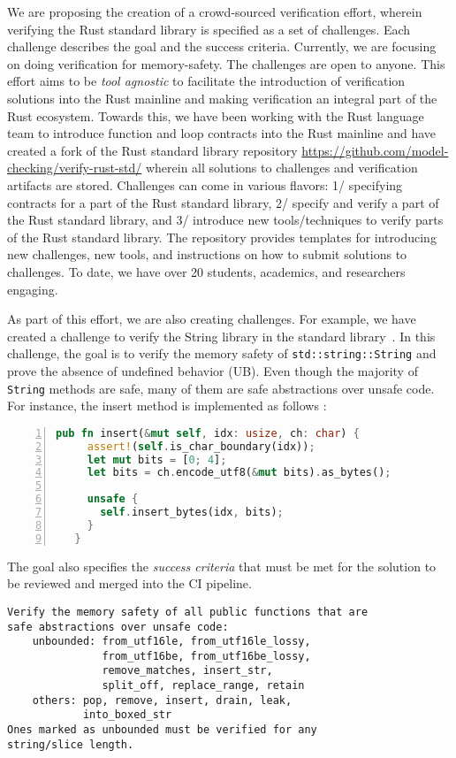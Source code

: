 \documentclass[runningheads]{llncs}
\begin{document}
We are proposing the creation of a crowd-sourced verification effort, wherein verifying the Rust standard library is specified as a set of challenges. Each challenge describes the goal and the success criteria. Currently, we are focusing on doing verification for memory-safety. The challenges are open to anyone. This effort aims to be \textit{tool agnostic} to facilitate the introduction of verification solutions into the Rust mainline and making verification an integral part of the Rust ecosystem. Towards this, we have been working with the Rust language team to introduce function and loop contracts into the Rust mainline and have created a fork of the Rust standard library repository \url{https://github.com/model-checking/verify-rust-std/} wherein all solutions to challenges and verification artifacts are stored. Challenges can come in various flavors: 1/ specifying contracts for a part of the Rust standard library, 2/ specify and verify a part of the Rust standard library, and 3/ introduce new tools/techniques to verify parts of the Rust standard library. The repository provides templates for introducing new challenges, new tools, and instructions on how to submit solutions to challenges. To date, we have over 20 students, academics, and researchers engaging.

As part of this effort, we are also creating challenges. For example, we have created a challenge to verify the String library in the standard library~\cite{stringChallenge}. In this challenge, the goal is to verify the memory safety of \texttt{std::string::String} and prove the absence of undefined behavior (UB). Even though the majority of \texttt{String} methods are safe, many of them are safe abstractions over unsafe code. For instance, the insert method is implemented as follows :
\begin{lstlisting}[language=rust, caption=Unsafe usage in String, frame=single, numbers=left]
   pub fn insert(&mut self, idx: usize, ch: char) {
     assert!(self.is_char_boundary(idx));
     let mut bits = [0; 4];
     let bits = ch.encode_utf8(&mut bits).as_bytes();

     unsafe {
       self.insert_bytes(idx, bits);
     }
   }
\end{lstlisting}

The goal also specifies the \textit{success criteria} that must be met for the solution to be reviewed and merged into the CI pipeline. 
\begin{lstlisting}[caption=Success criteria for the String challenge.,frame=single]
Verify the memory safety of all public functions that are
safe abstractions over unsafe code:
    unbounded: from_utf16le, from_utf16le_lossy, 
               from_utf16be, from_utf16be_lossy, 
               remove_matches, insert_str,
               split_off, replace_range, retain
    others: pop, remove, insert, drain, leak, 
            into_boxed_str
Ones marked as unbounded must be verified for any 
string/slice length.
\end{lstlisting}
\end{document}

